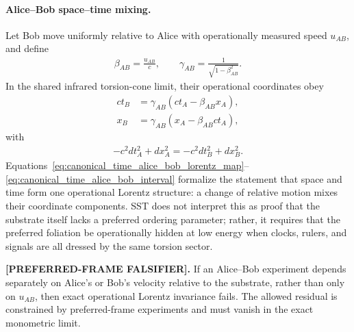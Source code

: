 \documentclass[11pt]{article}
\theoremstyle{definition}
\theoremstyle{plain}
\theoremstyle{remark}
\begin{document}
        \paragraph{Alice--Bob space--time mixing.}
        Let Bob move uniformly relative to Alice with operationally measured speed \(u_{AB}\), and define
        \begin{align}
            \beta_{AB}=\frac{u_{AB}}{c},
            \qquad
            \gamma_{AB}=\frac{1}{\sqrt{1-\beta_{AB}^2}}.
        \end{align}
        In the shared infrared torsion-cone limit, their operational coordinates obey
        \begin{align}
            ct_B
            &=
            \gamma_{AB}
            \left(ct_A-\beta_{AB}x_A\right),\\
            x_B
            &=
            \gamma_{AB}
            \left(x_A-\beta_{AB}ct_A\right),
            \label{eq:canonical_time_alice_bob_lorentz_map}
        \end{align}
        with
        \begin{align}
            -c^2dt_A^2+dx_A^2
            =
            -c^2dt_B^2+dx_B^2.
            \label{eq:canonical_time_alice_bob_interval}
        \end{align}
        Equations~\eqref{eq:canonical_time_alice_bob_lorentz_map}--\eqref{eq:canonical_time_alice_bob_interval} formalize the statement that space and time form one operational Lorentz structure: a change of relative motion mixes their coordinate components. SST does not interpret this as proof that the substrate itself lacks a preferred ordering parameter; rather, it requires that the preferred foliation be operationally hidden at low energy when clocks, rulers, and signals are all dressed by the same torsion sector.

        \textbf{[PREFERRED-FRAME FALSIFIER].}
        If an Alice--Bob experiment depends separately on Alice's or Bob's velocity relative to the substrate, rather than only on \(u_{AB}\), then exact operational Lorentz invariance fails. The allowed residual is constrained by preferred-frame experiments and must vanish in the exact monometric limit.
\end{document}

